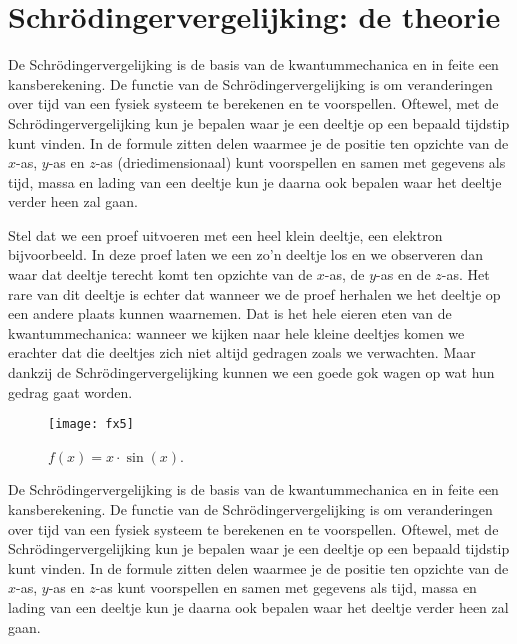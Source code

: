 \documentclass[11pt,fleqn]{book} %
\begin{document}
\section{Schrödingervergelijking: de theorie}
De Schrödingervergelijking is de basis van de kwantummechanica en in feite een kansberekening. De functie van de Schrödingervergelijking is om veranderingen over tijd van een fysiek systeem te berekenen en te voorspellen. Oftewel, met de Schrödingervergelijking kun je bepalen waar je een deeltje op een bepaald tijdstip kunt vinden. In de formule zitten delen waarmee je de positie ten opzichte van de $x$-as, $y$-as en $z$-as (driedimensionaal) kunt voorspellen en samen met gegevens als tijd, massa en lading van een deeltje kun je daarna ook bepalen waar het deeltje verder heen zal gaan.

Stel dat we een proef uitvoeren met een heel klein deeltje, een elektron bijvoorbeeld. In deze proef laten we een zo'n deeltje los en we observeren dan waar dat deeltje terecht komt ten opzichte van de $x$-as, de $y$-as en de $z$-as. Het rare van dit deeltje is echter dat wanneer we de proef herhalen we het deeltje op een andere plaats kunnen waarnemen. Dat is het hele eieren eten van de kwantummechanica: wanneer we kijken naar hele kleine deeltjes komen we erachter dat die deeltjes zich niet altijd gedragen zoals we verwachten. Maar dankzij de Schrödingervergelijking kunnen we een goede gok wagen op wat hun gedrag gaat worden.
\begin{figure}[h]
	\centering\texttt{[image: fx5]}
	\caption{$f(x)=x\cdot\sin{(x)}$.}
	\label{fig:fx5}
\end{figure}
De Schrödingervergelijking is de basis van de kwantummechanica en in feite een kansberekening. De functie van de Schrödingervergelijking is om veranderingen over tijd van een fysiek systeem te berekenen en te voorspellen. Oftewel, met de Schrödingervergelijking kun je bepalen waar je een deeltje op een bepaald tijdstip kunt vinden. In de formule zitten delen waarmee je de positie ten opzichte van de $x$-as, $y$-as en $z$-as kunt voorspellen en samen met gegevens als tijd, massa en lading van een deeltje kun je daarna ook bepalen waar het deeltje verder heen zal gaan.
\end{document}
